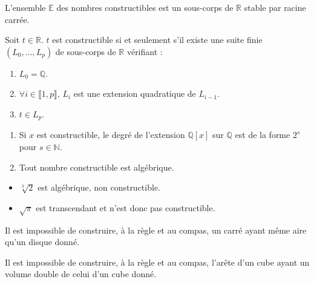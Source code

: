   \begin{theorem}
    L'ensemble $\mathbb{E}$ des nombres constructibles est un sous-corps de $\mathbb{R}$ stable par racine carrée.
  \end{theorem}


  \begin{theorem}
    Soit $t \in \mathbb{R}$. $t$ est constructible si et seulement s'il existe une suite finie $(L_0, \dots, L_p)$ de sous-corps de $\mathbb{R}$ vérifiant :
    \begin{enumerate}[label={\bfseries(\roman*)}]
      \item $L_0 = \mathbb{Q}$.
      \item $\forall i \in \llbracket 1, p \rrbracket$, $L_i$ est une extension quadratique de $L_{i-1}$.
      \item $t \in L_p$.
    \end{enumerate}
  \end{theorem}

  \begin{corollary}
    \begin{enumerate}[label={\bfseries(\roman*)}]
      \item Si $x$ est constructible, le degré de l'extension $\mathbb{Q}[x]$ sur $\mathbb{Q}$ est de la forme $2^s$ pour $s \in \mathbb{N}$.
      \item Tout nombre constructible est algébrique.
    \end{enumerate}
  \end{corollary}

  \begin{cexample}
    \begin{itemize}
      \item $\sqrt[3]{2}$ est algébrique, non constructible.
      \item $\sqrt{\pi}$ est transcendant et n'est donc pas constructible.
    \end{itemize}
  \end{cexample}

  \begin{application}
    Il est impossible de construire, à la règle et au compas, un carré ayant même aire qu'un disque donné.
  \end{application}

  \begin{application}
    Il est impossible de construire, à la règle et au compas, l'arête d'un cube ayant un volume double de celui d'un cube donné.
  \end{application}

